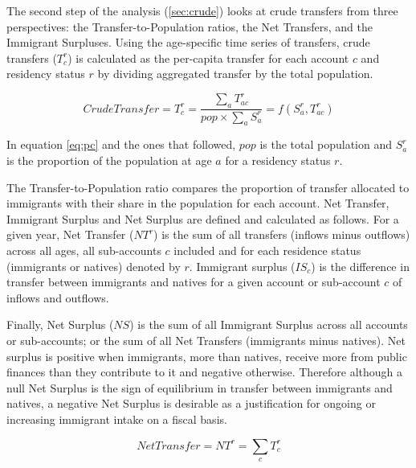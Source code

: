 \vspace{0.7em}\par
The second step of the analysis (\autoref{sec:crude}) looks at crude transfers from three perspectives: the Transfer-to-Population ratios, the Net Transfers, and the Immigrant Surpluses.
Using the age-specific time series of transfers, crude transfers (\(T^{r}_c \)) is calculated as the per-capita transfer for each account \(c \) and residency status \(r\) by dividing aggregated transfer by the total population.

\begin{equation}\label{eq:pc}
  Crude Transfer=T^{r}_c= \frac{\displaystyle\sum_{a}T^{r}_{ac} }{ pop \times \displaystyle\sum_{a} S^{r}_a}=f(S^{r}_a, T^{r}_{ac})
\end{equation}

In equation \eqref{eq:pc} and the ones that followed, \(pop\) is the total population and \(S^{r}_a\) is the proportion of the population at age \(a\) for a residency status \(r\).

\vspace{0.7em}\par
The Transfer-to-Population ratio compares the proportion of transfer allocated to immigrants with their share in the population for each account.
Net Transfer, Immigrant Surplus and Net Surplus are defined and calculated as follows.
For a given year, Net Transfer (\(NT^{r}\)) is the sum of all transfers (inflows minus outflows) across all ages, all sub-accounts \(c \) included and for each residence status (immigrants or natives) denoted by \(r \).
Immigrant surplus (\(IS_{c}\)) is the difference in transfer between immigrants and natives for a given account or sub-account \(c \) of inflows and outflows.

\vspace{0.7em}\par
Finally, Net Surplus (\( NS \)) is the sum of all Immigrant Surplus across all accounts or sub-accounts; or the sum of all Net Transfers (immigrants minus natives).
Net surplus is positive when immigrants, more than natives, receive more from public finances than they contribute to it and negative otherwise.
Therefore although a null Net Surplus is the sign of equilibrium in transfer between immigrants and natives, a negative Net Surplus is desirable as a justification for ongoing or increasing immigrant intake on a fiscal basis.

\begin{equation}\label{eq:nt}
  Net Transfer=NT^{r}= \displaystyle\sum_{c}T^{r}_{c}
\end{equation}

